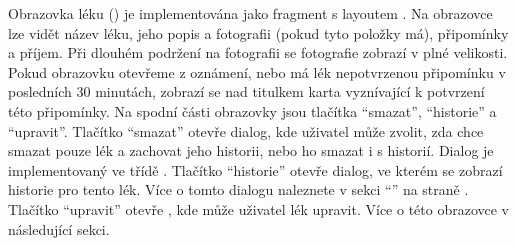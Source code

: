 \documentclass[../TakeYourPill.tex]{subfiles}
\begin{document}
Obrazovka léku () je implementována jako fragment s layoutem . Na obrazovce lze vidět název léku, jeho popis a fotografii (pokud tyto položky má), připomínky a příjem. Při dlouhém podržení na fotografii se fotografie zobrazí v plné velikosti. Pokud obrazovku otevřeme z oznámení, nebo má lék nepotvrzenou připomínku v posledních 30 minutách, zobrazí se nad titulkem karta vyznívající k potvrzení této připomínky. Na spodní části obrazovky jsou tlačítka \enquote{smazat}, \enquote{historie} a \enquote{upravit}. Tlačítko \enquote{smazat} otevře dialog, kde uživatel může zvolit, zda chce smazat pouze lék a zachovat jeho historii, nebo ho smazat i s historií. Dialog je implementovaný ve třídě . Tlačítko \enquote{historie} otevře dialog, ve kterém se zobrazí historie pro tento lék. Více o tomto dialogu naleznete v sekci \enquote{} na straně \pageref{sec:overview}. Tlačítko \enquote{upravit} otevře , kde může uživatel lék upravit. Více o této obrazovce v následující sekci.
\end{document}
